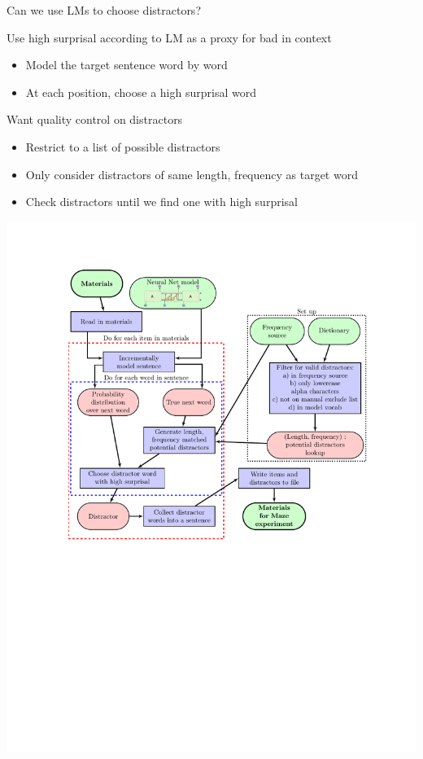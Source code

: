 \documentclass[ 12pt, xcolor=beamer,table,usenames,dvipsnames, ignorenonframetext, ngerman]{beamer}
\begin{document}
\begin{frame}{Can we use LMs to choose distractors?} 
	
	Use high surprisal according to LM as a proxy for bad in context
	\medskip
	
	\pause
	
	\begin{itemize}
		\item Model the target sentence word by word \pause
		\item At each position, choose a high surprisal word
	\end{itemize}
	\medskip
	\pause
	Want quality control on distractors
	\pause
	\begin{itemize}
		\item Restrict to a list of possible distractors \pause
		\item Only consider distractors of same length, frequency as target word \pause
		\item Check distractors until we find one with high surprisal
	\end{itemize}
	
\end{frame}

\begin{frame}
	\centering
	\includegraphics[clip, trim=3.25cm 5cm 2.5cm 2.5cm,width=.9\textwidth]{../Images/flow_2.pdf}
\end{frame}
\end{document}
